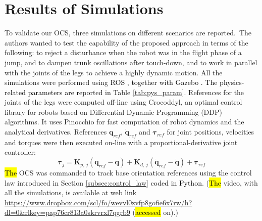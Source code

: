 \documentclass[sensors,article,accept,pdftex,moreauthors]{Definitions/mdpi}
\newcommand{\MF}[1]{\textcolor{black}{#1}}
\begin{document}
\section{Results of Simulations}
\label{sec:simulations}
To validate our OCS, three simulations on different scenarios {are reported.~The authors} wanted to test the capability of the proposed approach in terms of the following: 
to reject a disturbance when the robot was in the flight phase of a jump, and to dampen trunk oscillations after touch-down, 
and to work in parallel with the joints of the legs to achieve a highly dynamic motion. 
All the simulations were performed using \MF{ROS \cite{quigley2009ros}, together with Gazebo \cite{koenig2004design}. The physics-related parameters are reported in Table \ref{tab:pys_param}.} References for the joints of the legs were computed off-line using Crocoddyl, an optimal control library for robots based on Differential Dynamic Programming (DDP) algorithms. It uses Pinocchio for fast computation of robot dynamics and the analytical derivatives. References $\bm{q}_{ref}$, $\dot{\bm{q}}_{ref}$ and $\bm{\tau}_{ref}$ for joint positions, velocities and torques were then executed on-line with a proportional-derivative joint controller:
\begin{equation}
\bm{\tau}_j = \bm{K}_{p,\, j} (\bm{q}_{ref} - \bm{q}) + \bm{K}_{d,\, j} (\dot{\bm{q}}_{ref} - \dot{\bm{q}}) + \bm{\tau}_{ref}
\end{equation}
\hl{The} OCS was commanded to track base orientation references using the control law introduced in Section \ref{subsec:control_law} \MF{coded in Python}. ({\hl{The} %
 video, with all the simulations, is available at web link \url{https://www.dropbox.com/scl/fo/wevvl0zvfp8gofie6x7rw/h?dl=0&rlkey=pap76cr813a0skrvrxl7qgrb9}  (\hl{accessed} %
 on).)}
\end{document}
